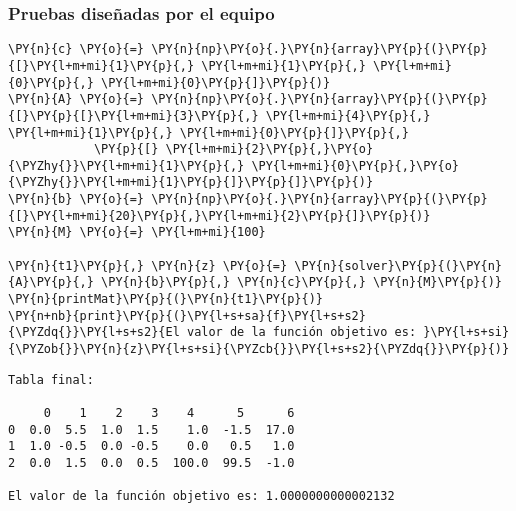 \documentclass[12pt]{article}
\begin{document}
\subsubsection{Pruebas diseñadas por el equipo}
\begin{tcolorbox}[breakable, size=fbox, boxrule=1pt, pad at break*=1mm,colback=cellbackground, colframe=cellborder]
\begin{Verbatim}[commandchars=\\\{\}]
\PY{n}{c} \PY{o}{=} \PY{n}{np}\PY{o}{.}\PY{n}{array}\PY{p}{(}\PY{p}{[}\PY{l+m+mi}{1}\PY{p}{,} \PY{l+m+mi}{1}\PY{p}{,} \PY{l+m+mi}{0}\PY{p}{,} \PY{l+m+mi}{0}\PY{p}{]}\PY{p}{)}
\PY{n}{A} \PY{o}{=} \PY{n}{np}\PY{o}{.}\PY{n}{array}\PY{p}{(}\PY{p}{[}\PY{p}{[}\PY{l+m+mi}{3}\PY{p}{,} \PY{l+m+mi}{4}\PY{p}{,} \PY{l+m+mi}{1}\PY{p}{,} \PY{l+m+mi}{0}\PY{p}{]}\PY{p}{,}
            \PY{p}{[} \PY{l+m+mi}{2}\PY{p}{,}\PY{o}{\PYZhy{}}\PY{l+m+mi}{1}\PY{p}{,} \PY{l+m+mi}{0}\PY{p}{,}\PY{o}{\PYZhy{}}\PY{l+m+mi}{1}\PY{p}{]}\PY{p}{]}\PY{p}{)}
\PY{n}{b} \PY{o}{=} \PY{n}{np}\PY{o}{.}\PY{n}{array}\PY{p}{(}\PY{p}{[}\PY{l+m+mi}{20}\PY{p}{,}\PY{l+m+mi}{2}\PY{p}{]}\PY{p}{)}
\PY{n}{M} \PY{o}{=} \PY{l+m+mi}{100}

\PY{n}{t1}\PY{p}{,} \PY{n}{z} \PY{o}{=} \PY{n}{solver}\PY{p}{(}\PY{n}{A}\PY{p}{,} \PY{n}{b}\PY{p}{,} \PY{n}{c}\PY{p}{,} \PY{n}{M}\PY{p}{)}
\PY{n}{printMat}\PY{p}{(}\PY{n}{t1}\PY{p}{)}
\PY{n+nb}{print}\PY{p}{(}\PY{l+s+sa}{f}\PY{l+s+s2}{\PYZdq{}}\PY{l+s+s2}{El valor de la función objetivo es: }\PY{l+s+si}{\PYZob{}}\PY{n}{z}\PY{l+s+si}{\PYZcb{}}\PY{l+s+s2}{\PYZdq{}}\PY{p}{)}
\end{Verbatim}
\end{tcolorbox}

\begin{Verbatim}[commandchars=\\\{\}]
Tabla final:

     0    1    2    3    4      5      6
0  0.0  5.5  1.0  1.5    1.0  -1.5  17.0
1  1.0 -0.5  0.0 -0.5    0.0   0.5   1.0
2  0.0  1.5  0.0  0.5  100.0  99.5  -1.0

El valor de la función objetivo es: 1.0000000000002132
\end{Verbatim}
\end{document}
